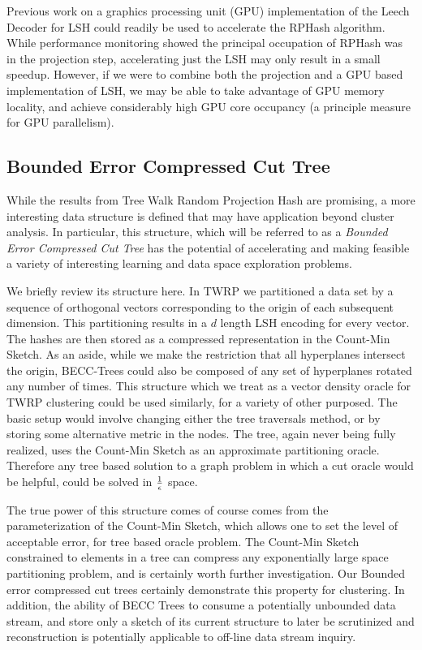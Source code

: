 Previous work \cite{carraher} on a graphics processing unit (GPU) implementation of the Leech Decoder for LSH could readily be
used to accelerate the \textsf{RPHash} algorithm.  While performance monitoring showed the principal
occupation of \textsf{RPHash} was in the projection step, accelerating just the LSH may only result in a
small speedup.   However, if we were to combine both the projection and a GPU based implementation of
LSH, we may be able to take advantage of GPU memory locality, and achieve considerably high GPU core
occupancy (a principle measure for GPU parallelism).

\subsection{Bounded Error Compressed Cut Tree}


While the results from Tree Walk Random Projection Hash are promising, a more interesting data
structure is defined that may have application beyond cluster analysis. In particular, this structure,
which will be referred to as a \emph{Bounded Error Compressed Cut Tree} has the potential of 
accelerating and making feasible a variety of interesting learning and data space exploration problems. 

We briefly review its structure here.  In \textsf{TWRP} we partitioned a data set by a sequence of orthogonal
vectors corresponding to the origin of each subsequent dimension.  This partitioning results in a 
$d$ length LSH encoding for every vector.  The hashes are then stored as a compressed representation
in the Count-Min Sketch.  As an aside, while we make the restriction that all hyperplanes intersect the origin,
BECC-Trees could also be composed of any set of hyperplanes rotated any number of times.  This
structure which we treat as a vector density oracle for \textsf{TWRP} clustering could be used similarly, for a variety
of other purposed. The basic setup would involve changing either the tree traversals method, or by storing some 
alternative metric in the nodes.  The tree, again never being fully realized, uses the Count-Min Sketch as an
 approximate partitioning oracle.  Therefore any tree based solution to a graph problem in which a
cut oracle would be helpful, could be solved in $1\over \epsilon$ space.

The true power of this structure comes 
of course comes from the parameterization of the Count-Min Sketch, which allows one to set the level of 
acceptable error, for tree based oracle problem.  The Count-Min Sketch constrained to elements in a tree
can compress any exponentially large space partitioning problem, and is certainly worth further investigation.  
Our Bounded error compressed cut trees certainly demonstrate this property for clustering.  In addition, the ability 
of BECC Trees to consume a potentially unbounded data stream, and store only a sketch of its current structure to 
later be scrutinized and reconstruction is potentially applicable to off-line data stream inquiry.  


